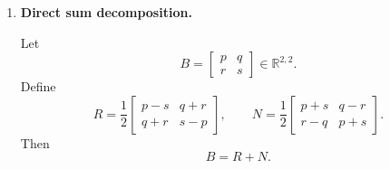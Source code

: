 \documentclass[12pt]{article}
\newcommand{\R}{\mathbb{R}}
\DeclareMathOperator{\Range}{Range}
\newcommand{\Span}{\operatorname{span}}
\begin{document}
\begin{enumerate}[label=(\alph*)]
From the formula
\[
T(A)=
\begin{bmatrix}
a-d & b+c\\
b+c & d-a
\end{bmatrix},
\]
every output has the form
\[
\begin{bmatrix}x&y\\y&-x\end{bmatrix}.
\]
So
\[
\Range(T)\subseteq
\left\{
\begin{bmatrix}x&y\\y&-x\end{bmatrix}
:x,y\in\R
\right\}.
\]
Conversely, given any matrix
\[
Y=\begin{bmatrix}x&y\\y&-x\end{bmatrix},
\]
choose
\[
A=\begin{bmatrix}x&y\\0&0\end{bmatrix}.
\]
Then
\[
T(A)=
\begin{bmatrix}
x&y\\
y&-x
\end{bmatrix}
=Y.
\]
Thus
\[
\Range(T)=
\left\{
\begin{bmatrix}x&y\\y&-x\end{bmatrix}
:x,y\in\R
\right\}.
\]
Hence
\[
\Range(T)
=
\Span\left\{
\begin{bmatrix}1&0\\0&-1\end{bmatrix},
\begin{bmatrix}0&1\\1&0\end{bmatrix}
\right\}.
\]
Therefore a basis for \(\Range(T)\) is
\[
\boxed{
\left\{
\begin{bmatrix}1&0\\0&-1\end{bmatrix},
\begin{bmatrix}0&1\\1&0\end{bmatrix}
\right\}.}
\]

\item \textbf{Direct sum decomposition.}

Let
\[
B=\begin{bmatrix}p&q\\r&s\end{bmatrix}\in \R^{2,2}.
\]
Define
\[
R=
\frac12
\begin{bmatrix}
p-s & q+r\\
q+r & s-p
\end{bmatrix},
\qquad
N=
\frac12
\begin{bmatrix}
p+s & q-r\\
r-q & p+s
\end{bmatrix}.
\]
Then
\[
B=R+N.
\]


\end{enumerate}
\end{document}
